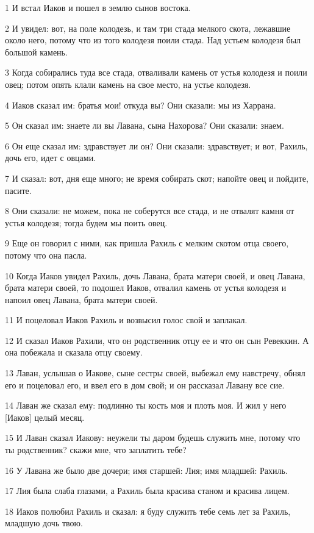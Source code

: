 \par 1 И встал Иаков и пошел в землю сынов востока.
\par 2 И увидел: вот, на поле колодезь, и там три стада мелкого скота, лежавшие около него, потому что из того колодезя поили стада. Над устьем колодезя был большой камень.
\par 3 Когда собирались туда все стада, отваливали камень от устья колодезя и поили овец; потом опять клали камень на свое место, на устье колодезя.
\par 4 Иаков сказал им: братья мои! откуда вы? Они сказали: мы из Харрана.
\par 5 Он сказал им: знаете ли вы Лавана, сына Нахорова? Они сказали: знаем.
\par 6 Он еще сказал им: здравствует ли он? Они сказали: здравствует; и вот, Рахиль, дочь его, идет с овцами.
\par 7 И сказал: вот, дня еще много; не время собирать скот; напойте овец и пойдите, пасите.
\par 8 Они сказали: не можем, пока не соберутся все стада, и не отвалят камня от устья колодезя; тогда будем мы поить овец.
\par 9 Еще он говорил с ними, как пришла Рахиль с мелким скотом отца своего, потому что она пасла.
\par 10 Когда Иаков увидел Рахиль, дочь Лавана, брата матери своей, и овец Лавана, брата матери своей, то подошел Иаков, отвалил камень от устья колодезя и напоил овец Лавана, брата матери своей.
\par 11 И поцеловал Иаков Рахиль и возвысил голос свой и заплакал.
\par 12 И сказал Иаков Рахили, что он родственник отцу ее и что он сын Ревеккин. А она побежала и сказала отцу своему.
\par 13 Лаван, услышав о Иакове, сыне сестры своей, выбежал ему навстречу, обнял его и поцеловал его, и ввел его в дом свой; и он рассказал Лавану все сие.
\par 14 Лаван же сказал ему: подлинно ты кость моя и плоть моя. И жил у него [Иаков] целый месяц.
\par 15 И Лаван сказал Иакову: неужели ты даром будешь служить мне, потому что ты родственник? скажи мне, что заплатить тебе?
\par 16 У Лавана же было две дочери; имя старшей: Лия; имя младшей: Рахиль.
\par 17 Лия была слаба глазами, а Рахиль была красива станом и красива лицем.
\par 18 Иаков полюбил Рахиль и сказал: я буду служить тебе семь лет за Рахиль, младшую дочь твою.
